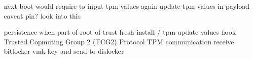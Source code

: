 next boot would require to input tpm values again
update tpm values in payload
caveat pin? look into this

persistence when part of root of trust
fresh install / tpm update values
hook Trusted Copmuting Group 2 (TCG2) Protocol
TPM communication
\cite[6.7.3]{tcg-efi-platform-spec}
receive bitlocker vmk key and send to dislocker

